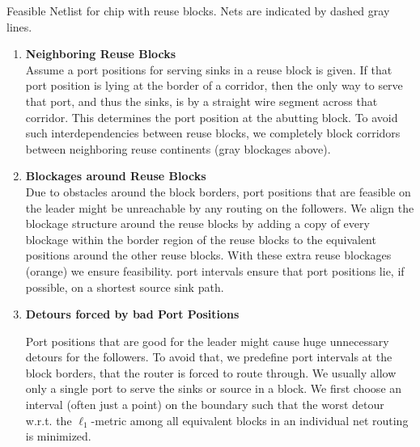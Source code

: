 \documentclass[a2paper]{bigsposter}
\begin{document}
\begin{blockrow}
\begin{minipage}{0.2\blockwidth}
{\raggedright\tiny \begin{spacing}{0.9}
		Feasible Netlist for chip with reuse blocks. Nets are indicated by dashed gray lines.
\end{spacing}	}
\end{minipage}
\begin{enumerate}
\item \textbf{Neighboring Reuse Blocks}\\
Assume a port positions for serving sinks in a reuse block is given. If that port position is lying at the border of a corridor, then the only way to serve that port, and thus the sinks, is by a straight wire segment across that corridor. This determines the port position at the abutting block. To avoid such interdependencies between reuse blocks, we completely block corridors between neighboring reuse continents (gray blockages above).  %
\item \textbf{Blockages around Reuse Blocks}\\
Due to obstacles around the block borders, port positions that are feasible on the leader might be unreachable by any routing on the followers.
We align the blockage structure around the reuse blocks by adding a copy of every blockage within the border region of the reuse blocks to the equivalent positions around the other reuse blocks. With these extra reuse blockages (orange)  we ensure feasibility. port intervals ensure that port positions lie, if possible, on a shortest source sink path.
\item \textbf{Detours forced by bad Port Positions}\\	
 \begin{minipage}{0.55\blockwidth}
Port positions that are good for the leader might cause huge unnecessary detours  for the followers.
To avoid that, we predefine port intervals at the block borders, that the router is forced to route through. We usually allow only a single port to serve the sinks or source in a block.
We first choose an interval (often just a point) on the boundary such that the worst detour w.r.t. the  $\ell_1$-metric among all equivalent blocks in an individual net routing is minimized. 



\end{minipage}
\hfill
\begin{minipage}{0.35\blockwidth} %
	\centering
{}
\end{minipage}
\end{enumerate}
\end{blockrow}
\end{document}
